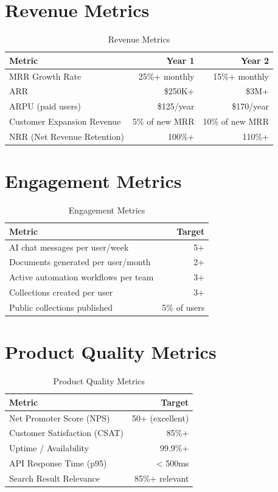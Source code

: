 \documentclass{report}
\begin{document}
\section{Revenue Metrics}

\begin{table}[h]
\centering
\begin{tabular}{|l|r|r|}
\toprule
\textbf{Metric} & \textbf{Year 1} & \textbf{Year 2} \\
\midrule
MRR Growth Rate & 25\%+ monthly & 15\%+ monthly \\
ARR & \$250K+ & \$3M+ \\
ARPU (paid users) & \$125/year & \$170/year \\
Customer Expansion Revenue & 5\% of new MRR & 10\% of new MRR \\
NRR (Net Revenue Retention) & 100\%+ & 110\%+ \\
\bottomrule
\end{tabular}
\caption{Revenue Metrics}
\end{table}

\section{Engagement Metrics}

\begin{table}[h]
\centering
\begin{tabular}{|l|r|}
\toprule
\textbf{Metric} & \textbf{Target} \\
\midrule
AI chat messages per user/week & 5+ \\
Documents generated per user/month & 2+ \\
Active automation workflows per team & 3+ \\
Collections created per user & 3+ \\
Public collections published & 5\% of users \\
\bottomrule
\end{tabular}
\caption{Engagement Metrics}
\end{table}

\section{Product Quality Metrics}

\begin{table}[h]
\centering
\begin{tabular}{|l|r|}
\toprule
\textbf{Metric} & \textbf{Target} \\
\midrule
Net Promoter Score (NPS) & 50+ (excellent) \\
Customer Satisfaction (CSAT) & 85\%+ \\
Uptime / Availability & 99.9\%+ \\
API Response Time (p95) & < 500ms \\
Search Result Relevance & 85\%+ relevant \\
\bottomrule
\end{tabular}
\caption{Product Quality Metrics}
\end{table}
\end{document}
